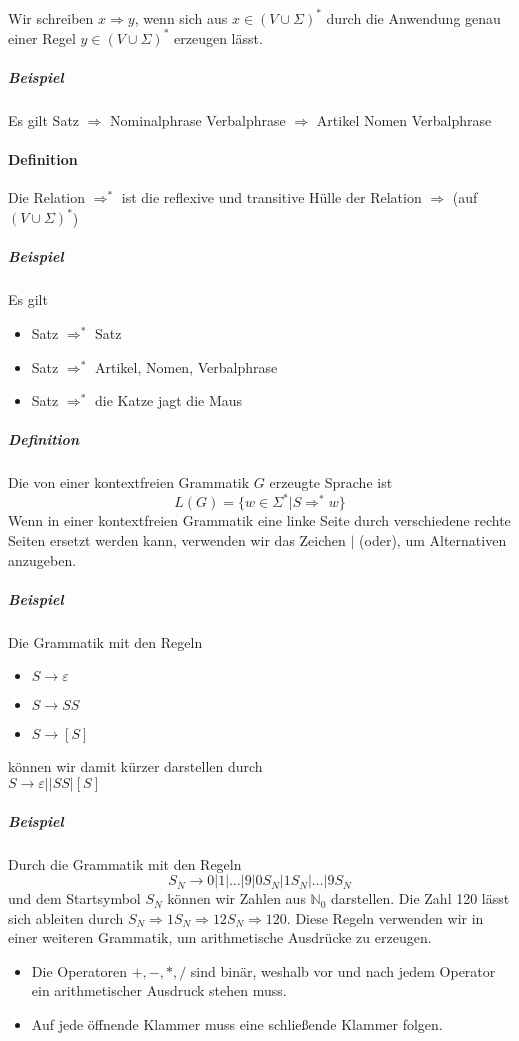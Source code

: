\documentclass[a4paper]{scrartcl}
\begin{document}
Wir schreiben $x \Rightarrow y$, wenn sich aus $x \in (V \cup \Sigma)^*$ durch die Anwendung genau einer Regel $y \in (V \cup \Sigma)^*$ erzeugen lässt.

\subparagraph{Beispiel} Es gilt Satz $\Rightarrow$ Nominalphrase Verbalphrase $\Rightarrow$ Artikel Nomen Verbalphrase

\paragraph{Definition} Die Relation $\Rightarrow^*$ ist die reflexive und transitive Hülle der Relation $\Rightarrow$ (auf $(V\cup \Sigma)^*$)

\subparagraph{Beispiel} Es gilt
\begin{itemize}
\item Satz $\Rightarrow^*$ Satz
\item Satz $\Rightarrow^*$ Artikel, Nomen, Verbalphrase
\item Satz $\Rightarrow^*$ die Katze jagt die Maus
\end{itemize}

\subparagraph{Definition} Die von einer kontextfreien Grammatik $G$ erzeugte Sprache ist
\[L(G) = \{ w \in \Sigma^* | S \Rightarrow^* w \}\]
Wenn in einer kontextfreien Grammatik eine linke Seite durch verschiedene rechte Seiten ersetzt werden kann, verwenden wir das Zeichen $|$ (oder), um Alternativen anzugeben.

\subparagraph{Beispiel} Die Grammatik mit den Regeln
\begin{itemize}
\item $S \to \varepsilon$
\item $S \to SS$
\item$S \to [S]$ 
\end{itemize}
können wir damit kürzer darstellen durch\\
$S \to \varepsilon || SS | [S]$

\subparagraph{Beispiel} Durch die Grammatik mit den Regeln
\[S_N \to 0|1|\dots |9|0S_N|1S_N | \dots | 9S_N\] und dem Startsymbol $S_N$ können wir Zahlen aus $\mathbb{N}_0$ darstellen. Die Zahl 120 lässt sich ableiten durch $S_N \Rightarrow 1S_N \Rightarrow 12 S_N \Rightarrow 120$. Diese Regeln verwenden wir in einer weiteren Grammatik, um arithmetische Ausdrücke zu erzeugen.
\begin{itemize}
\item Die Operatoren $+,-,*,/$ sind binär, weshalb vor und nach jedem Operator ein arithmetischer Ausdruck stehen muss.
\item Auf jede öffnende Klammer muss eine schließende Klammer folgen.

\end{itemize}
\end{document}
